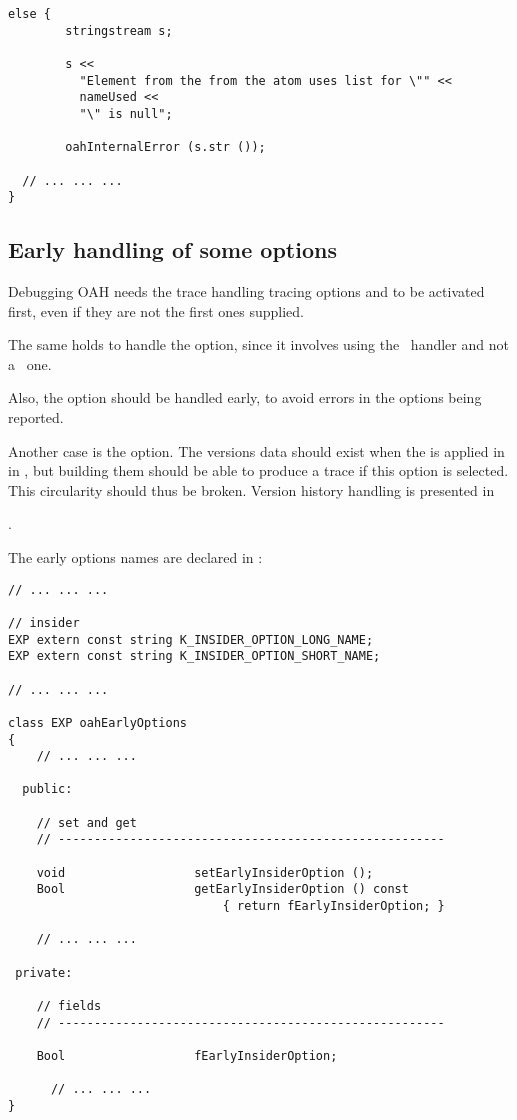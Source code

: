 {\begin{lstlisting}[language=CPlusPlus]
      else {
        stringstream s;

        s <<
          "Element from the from the atom uses list for \"" <<
          nameUsed <<
          "\" is null";

        oahInternalError (s.str ());
        
  // ... ... ...
}
\end{lstlisting}


\subsection{Early handling of some options}

Debugging OAH needs the trace handling tracing options  and  to be activated first, even if they are not the first ones supplied.

The same holds to handle the  option, since it involves using the \insider\ handler and not a \regular\ one.

Also, the  option should be handled early, to avoid errors in the options being reported.

Another case is the  option. The versions data should exist when the  is applied in  in , but building them should be able to produce a trace if this option is selected. This circularity  should thus be broken. Version history handling is presented in }.

The early options names are declared in :
\begin{lstlisting}[language=Terminal]
// ... ... ...

// insider
EXP extern const string K_INSIDER_OPTION_LONG_NAME;
EXP extern const string K_INSIDER_OPTION_SHORT_NAME;

// ... ... ...

class EXP oahEarlyOptions
{
	// ... ... ...

  public:

    // set and get
    // ------------------------------------------------------

    void                  setEarlyInsiderOption ();
    Bool                  getEarlyInsiderOption () const
                              { return fEarlyInsiderOption; }

	// ... ... ...

 private:

    // fields
    // ------------------------------------------------------

    Bool                  fEarlyInsiderOption;

	  // ... ... ...
}
\end{lstlisting}

